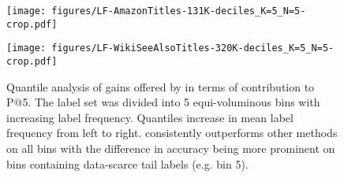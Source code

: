 \begin{figure}
    \centering
    \texttt{[image: figures/LF-AmazonTitles-131K-deciles\_K=5\_N=5-crop.pdf]}
    
    \vspace{0.5cm}
    
    \texttt{[image: figures/LF-WikiSeeAlsoTitles-320K-deciles\_K=5\_N=5-crop.pdf]}
    \caption{Quantile analysis of gains offered by \alg in terms of contribution to P@5. The label set was divided into 5 equi-voluminous bins with increasing label frequency. Quantiles increase in mean label frequency from left to right. \alg consistently outperforms other methods on all bins with the difference in accuracy being more prominent on bins containing data-scarce tail labels (e.g. bin 5).}
    \label{fig:sup:contrib}
\end{figure}